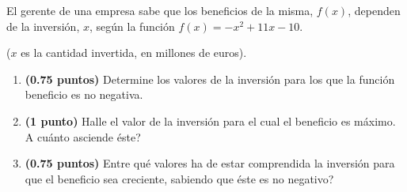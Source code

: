 
El gerente de una empresa sabe que los beneficios de la misma, $f(x)$, dependen de la inversión, $x$, según la función $f(x)=-x^2+11x-10$.

($x$ es la cantidad invertida, en millones de euros).
\begin{enumerate}[label=\alph*)]
\item \textbf{(0.75 puntos)} Determine los valores de la inversión para los que la función beneficio es no negativa.
\item \textbf{(1 punto)} Halle el valor de la inversión para el cual el beneficio es máximo. \textquestiondown{}A cuánto asciende éste?
\item \textbf{(0.75 puntos)} \textquestiondown{}Entre qué valores ha de estar comprendida la inversión para que el beneficio sea creciente, sabiendo que éste es no negativo?
\end{enumerate}
